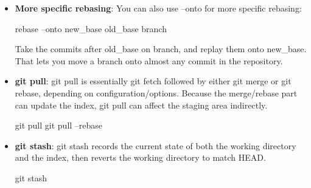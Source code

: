 \documentclass{report}
\begin{document}
\begin{itemize}
\begin{itemize}
                \item \textbf{More specific rebasing}: You can also use --onto for more specific rebasing:                   
                    \bigbreak \noindent 
                    \begin{bashcode}
                        rebase --onto new_base old_base branch
                    \end{bashcode}
                    \bigbreak \noindent 
                    Take the commits after old\_base on branch, and replay them onto new\_base. That lets you move a branch onto almost any commit in the repository.
                \item \textbf{git pull}: git pull is essentially git fetch followed by either git merge or git rebase, depending on configuration/options. Because the merge/rebase part can update the index, git pull can affect the staging area indirectly.
                    \bigbreak \noindent 
                    \begin{bashcode}
                        git pull
                        git pull --rebase
                    \end{bashcode}
                \item \textbf{git stash}: git stash records the current state of both the working directory and the index, then reverts the working directory to match HEAD.
                    \bigbreak \noindent 
                    \begin{bashcode}
                        git stash


\end{bashcode}
\end{itemize}
\end{itemize}
\end{document}
